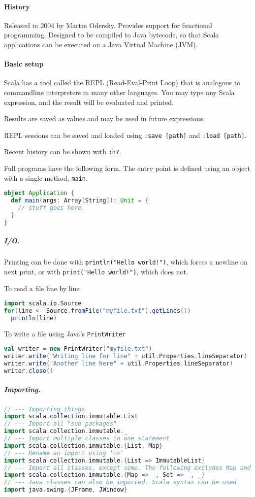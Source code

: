 \paragraph{History}
Released in 2004 by Martin Odersky. Provides support for functional programming. Designed to be compiled to Java bytecode, so that Scala applications can be executed on a Java Virtual Machine (JVM).

\paragraph{Basic setup}
Scala has a tool called the REPL (Read-Eval-Print Loop) that is analogous to
  commandline interpreters in many other languages. You may type any Scala
  expression, and the result will be evaluated and printed.

Results are saved as values and may be used in future expressions.

REPL sessions can be saved and loaded using \texttt{:save [path]} and \texttt{:load [path]}.

Recent history can be shown with \texttt{:h?}.

Full programs have the following form. The entry point is defined using an object with a single method, \texttt{main}.
\begin{lstlisting}[language=scala, style=program]
object Application {
  def main(args: Array[String]): Unit = {
    // stuff goes here.
  }
}
\end{lstlisting}

\subparagraph{I/O.} Printing can be done with \texttt{println("Hello world!")}, which forces a newline on next print, or with \texttt{print("Hello world!")}, which does not.

To read a file line by line
\begin{lstlisting}[language=scala, style=snippet]
import scala.io.Source
for(line <- Source.fromFile("myfile.txt").getLines())
  println(line)
\end{lstlisting}

To write a file using Java's \texttt{PrintWriter}
\begin{lstlisting}[language=scala, style=snippet]
val writer = new PrintWriter("myfile.txt")
writer.write("Writing line for line" + util.Properties.lineSeparator)
writer.write("Another line here" + util.Properties.lineSeparator)
writer.close()
\end{lstlisting}

\subparagraph{Importing.}
\begin{lstlisting}[language=scala, style=snippet]
// --- Importing things
import scala.collection.immutable.List
// --- Import all "sub packages"
import scala.collection.immutable._
// --- Import multiple classes in one statement
import scala.collection.immutable.{List, Map}
// --- Rename an import using '=>'
import scala.collection.immutable.{List => ImmutableList}
// --- Import all classes, except some. The following excludes Map and Set:
import scala.collection.immutable.{Map => _, Set => _, _}
// --- Java classes can also be imported. Scala syntax can be used
import java.swing.{JFrame, JWindow}
\end{lstlisting}


